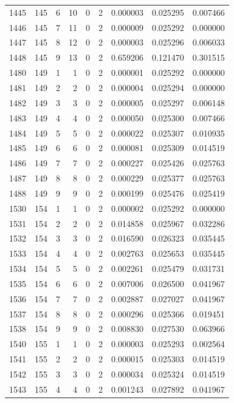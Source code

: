 \begin{longtable}{rrrrrrrrr}
1445 & 145 & 6 & 10 & 0 & 2 & 0.000003 & 0.025295 & 0.007466 \\
1446 & 145 & 7 & 11 & 0 & 2 & 0.000009 & 0.025292 & 0.000000 \\
1447 & 145 & 8 & 12 & 0 & 2 & 0.000003 & 0.025296 & 0.006033 \\
1448 & 145 & 9 & 13 & 0 & 2 & 0.659206 & 0.121470 & 0.301515 \\
1480 & 149 & 1 & 1 & 0 & 2 & 0.000001 & 0.025292 & 0.000000 \\
1481 & 149 & 2 & 2 & 0 & 2 & 0.000004 & 0.025294 & 0.000000 \\
1482 & 149 & 3 & 3 & 0 & 2 & 0.000005 & 0.025297 & 0.006148 \\
1483 & 149 & 4 & 4 & 0 & 2 & 0.000050 & 0.025300 & 0.007466 \\
1484 & 149 & 5 & 5 & 0 & 2 & 0.000022 & 0.025307 & 0.010935 \\
1485 & 149 & 6 & 6 & 0 & 2 & 0.000081 & 0.025309 & 0.014519 \\
1486 & 149 & 7 & 7 & 0 & 2 & 0.000227 & 0.025426 & 0.025763 \\
1487 & 149 & 8 & 8 & 0 & 2 & 0.000229 & 0.025377 & 0.025763 \\
1488 & 149 & 9 & 9 & 0 & 2 & 0.000199 & 0.025476 & 0.025419 \\
1530 & 154 & 1 & 1 & 0 & 2 & 0.000002 & 0.025292 & 0.000000 \\
1531 & 154 & 2 & 2 & 0 & 2 & 0.014858 & 0.025967 & 0.032286 \\
1532 & 154 & 3 & 3 & 0 & 2 & 0.016590 & 0.026323 & 0.035445 \\
1533 & 154 & 4 & 4 & 0 & 2 & 0.002763 & 0.025653 & 0.035445 \\
1534 & 154 & 5 & 5 & 0 & 2 & 0.002261 & 0.025479 & 0.031731 \\
1535 & 154 & 6 & 6 & 0 & 2 & 0.007006 & 0.026500 & 0.041967 \\
1536 & 154 & 7 & 7 & 0 & 2 & 0.002887 & 0.027027 & 0.041967 \\
1537 & 154 & 8 & 8 & 0 & 2 & 0.000296 & 0.025366 & 0.019451 \\
1538 & 154 & 9 & 9 & 0 & 2 & 0.008830 & 0.027530 & 0.063966 \\
1540 & 155 & 1 & 1 & 0 & 2 & 0.000003 & 0.025293 & 0.002564 \\
1541 & 155 & 2 & 2 & 0 & 2 & 0.000015 & 0.025303 & 0.014519 \\
1542 & 155 & 3 & 3 & 0 & 2 & 0.000034 & 0.025324 & 0.014519 \\
1543 & 155 & 4 & 4 & 0 & 2 & 0.001243 & 0.027892 & 0.041967 \\

\end{longtable}
